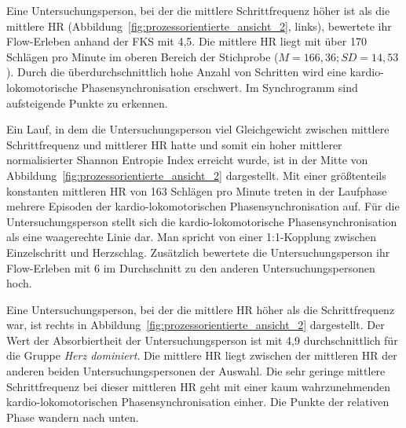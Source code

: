 Eine Untersuchungsperson, bei der die mittlere Schrittfrequenz höher ist als die mittlere \ac{HR} (Abbildung~\ref{fig:prozessorientierte_ansicht_2}, links), bewertete ihr Flow-Erleben anhand der \ac{FKS} mit 4,5. Die mittlere \ac{HR} liegt mit über 170 Schlägen pro Minute im oberen Bereich der Stichprobe ($M = 166{,}36; SD = 14{,}53$). Durch die überdurchschnittlich hohe Anzahl von Schritten wird eine kardio-lokomotorische Phasensynchronisation erschwert. Im Synchrogramm sind aufsteigende Punkte zu erkennen.
\begin{sidewaysfigure}
	 \caption[Beispielhafte Prozessdarstellung von mehreren Untersuchungspersonen]{Beispielhafte Prozessdarstellung -- eine Minute Daten einer Untersuchungsperson der Gruppe Schritt dominiert (links), einer Untersuchungsperson Geleichgewicht (Mitte) und einer Untersuchungsperson der Gruppe Herz dominert (rechts) \\
	\hspace{ 
	\textwidth}\emph{Anmerkung}: Mittlere SF = Mittlere Schrittfrequenz \\
	\hspace{ 
	\textwidth} Rel. Phase = Relative Phase} \label{fig:prozessorientierte_ansicht_2} 
\end{sidewaysfigure}

Ein Lauf, in dem die Untersuchungsperson viel Gleichgewicht zwischen mittlere Schrittfrequenz und mittlerer \ac{HR} hatte und somit ein hoher mittlerer normalisierter Shannon Entropie Index erreicht wurde, ist in der Mitte von Abbildung~\ref{fig:prozessorientierte_ansicht_2} dargestellt. Mit einer größtenteils konstanten mittleren \ac{HR} von 163 Schlägen pro Minute treten in der Laufphase mehrere Episoden der kardio-lokomotorischen Phasensynchronisation auf. Für die Untersuchungsperson stellt sich die kardio-lokomotorische Phasensynchronisation als eine waagerechte Linie dar. Man spricht von einer 1:1-Kopplung zwischen Einzelschritt und Herzschlag. Zusätzlich bewertete die Untersuchungsperson ihr Flow-Erleben mit 6 im Durchschnitt zu den anderen Untersuchungspersonen hoch. 

Eine Untersuchungsperson, bei der die mittlere \ac{HR} höher als die Schrittfrequenz war, ist rechts in Abbildung~\ref{fig:prozessorientierte_ansicht_2} dargestellt. Der Wert der Absorbiertheit der Untersuchungsperson ist mit 4,9 durchschnittlich für die Gruppe \emph{Herz dominiert}. Die mittlere \ac{HR} liegt zwischen der mittleren \ac{HR} der anderen beiden Untersuchungspersonen der Auswahl. Die sehr geringe mittlere Schrittfrequenz bei dieser mittleren \ac{HR} geht mit einer kaum wahrzunehmenden kardio-lokomotorischen Phasensynchronisation einher. Die Punkte der relativen Phase wandern nach unten. 


